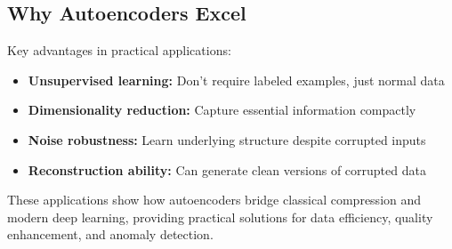 \subsection{Why Autoencoders Excel}

Key advantages in practical applications:
\begin{itemize}
    \item \textbf{Unsupervised learning:} Don't require labeled examples, just normal data
    \item \textbf{Dimensionality reduction:} Capture essential information compactly
    \item \textbf{Noise robustness:} Learn underlying structure despite corrupted inputs
    \item \textbf{Reconstruction ability:} Can generate clean versions of corrupted data
\end{itemize}

These applications show how autoencoders bridge classical compression and modern deep learning, providing practical solutions for data efficiency, quality enhancement, and anomaly detection.


